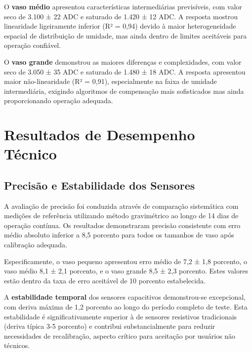 \documentclass[twoside,english,brazilian]{UNISINOSmonografia}
\begin{document}
O \textbf{vaso médio} apresentou características intermediárias previsíveis, com valor seco de 3.100 ± 22 ADC e saturado de 1.420 ± 12 ADC. A resposta mostrou linearidade ligeiramente inferior (R² = 0,94) devido à maior heterogeneidade espacial de distribuição de umidade, mas ainda dentro de limites aceitáveis para operação confiável.

O \textbf{vaso grande} demonstrou as maiores diferenças e complexidades, com valor seco de 3.050 ± 35 ADC e saturado de 1.480 ± 18 ADC. A resposta apresentou maior não-linearidade (R² = 0,91), especialmente na faixa de umidade intermediária, exigindo algoritmos de compensação mais sofisticados mas ainda proporcionando operação adequada.


\section{Resultados de Desempenho Técnico}

\subsection{Precisão e Estabilidade dos Sensores}

A avaliação de precisão foi conduzida através de comparação sistemática com medições de referência utilizando método gravimétrico ao longo de 14 dias de operação contínua. Os resultados demonstraram precisão consistente com erro médio absoluto inferior a 8,5 porcento para todos os tamanhos de vaso após calibração adequada.

Especificamente, o vaso pequeno apresentou erro médio de 7,2 ± 1,8 porcento, o vaso médio 8,1 ± 2,1 porcento, e o vaso grande 8,5 ± 2,3 porcento. Estes valores estão dentro da taxa de erro aceitável de 10 porcento estabelecida.


A \textbf{estabilidade temporal} dos sensores capacitivos demonstrou-se excepcional, com deriva máxima de 1,2 porcento ao longo do período completo de teste. Esta estabilidade é significativamente superior à de sensores resistivos tradicionais (deriva típica 3-5 porcento) e contribui substancialmente para reduzir necessidades de recalibração, aspecto crítico para aceitação por usuários não técnicos.
\end{document}
